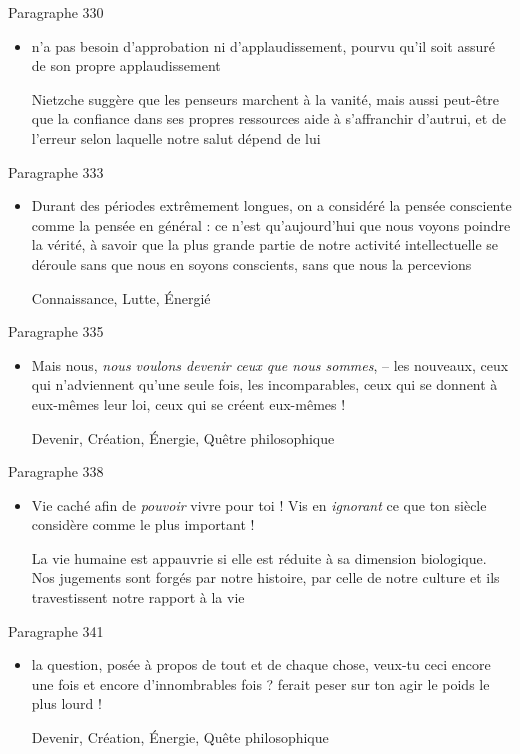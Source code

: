 \documentclass[french,a4paper,11pt,answers]{exam}
\newcommand{\cit}[2]{\og #1 \fg{} \begin{solution}{ #2 }\end{solution}} %
\begin{document}
	\begin{cadre}{Paragraphe 330}
		\begin{itemize}
			\item \cit{[le penseur] n'a pas besoin d'approbation ni d'applaudissement, pourvu qu'il soit assuré de son propre applaudissement}
				{Nietzche suggère que les penseurs marchent à la vanité, mais aussi peut-être que la confiance dans ses propres ressources aide à s'affranchir d'autrui, et de l'erreur selon laquelle notre salut dépend de lui}
		\end{itemize}
	\end{cadre}
	
	\begin{cadre}{Paragraphe 333}
		\begin{itemize}
			\item \cit{Durant des périodes extrêmement longues, on a considéré la pensée consciente comme la pensée en général : ce n'est qu'aujourd'hui que nous voyons poindre la vérité, à savoir que la plus grande partie de notre activité intellectuelle se déroule sans que nous en soyons conscients, sans que nous la percevions}
				{Connaissance, Lutte, Énergié} %
		\end{itemize}
	\end{cadre}

	\begin{cadre}{Paragraphe 335}
		\begin{itemize}
			\item \cit{Mais nous, \emph{nous voulons devenir ceux que nous sommes}, -- les nouveaux, ceux qui n'adviennent qu'une seule fois, les incomparables, ceux qui se donnent à eux-mêmes leur loi, ceux qui se créent eux-mêmes !}
				{Devenir, Création, Énergie, Quêtre philosophique}
		\end{itemize}
	\end{cadre}

	\begin{cadre}{Paragraphe 338}
		\begin{itemize}
			\item \cit{Vie caché afin de \emph{pouvoir} vivre pour toi ! Vis en \emph{ignorant} ce que ton siècle considère comme le plus important !}
				{La vie humaine est appauvrie si elle est réduite à sa dimension biologique. Nos jugements sont forgés par notre histoire, par celle de notre culture et ils travestissent notre rapport à la vie}
		\end{itemize}
	\end{cadre}
	
	\begin{cadre}{Paragraphe 341}
		\begin{itemize}
			\item \cit{la question, posée à propos de tout et de chaque chose, \og veux-tu ceci encore une fois et encore d'innombrables fois ? \fg{} ferait peser sur ton agir le poids le plus lourd !}
				{Devenir, Création, Énergie, Quête philosophique}
		\end{itemize}
	\end{cadre}
\end{document}
